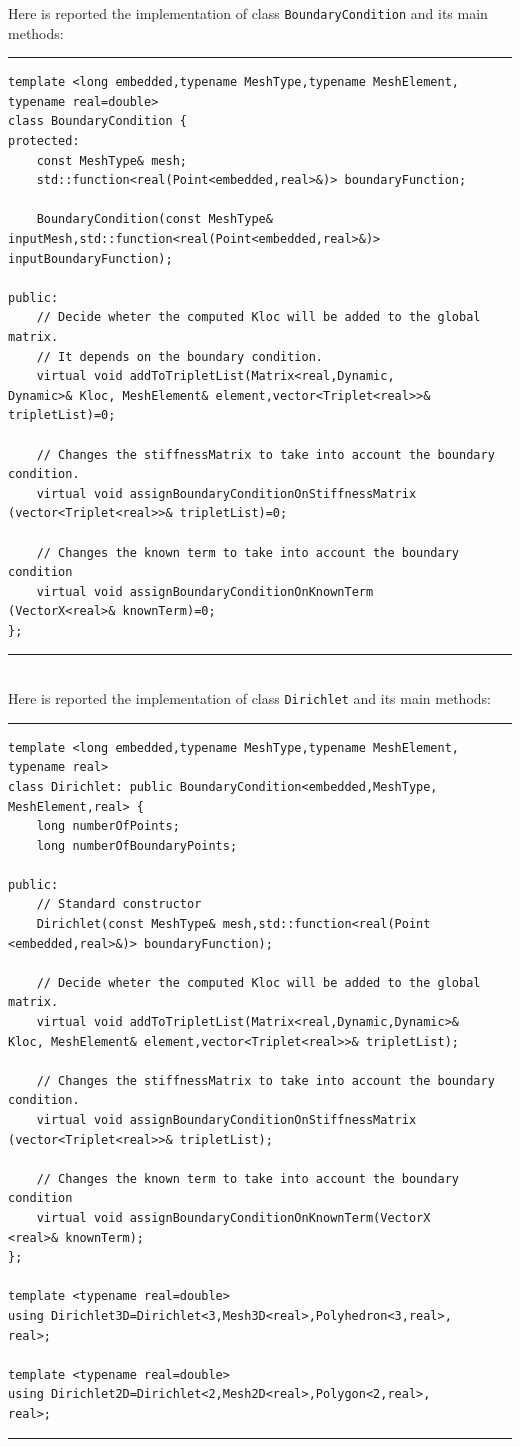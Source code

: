 Here is reported the implementation of class \verb|BoundaryCondition| and its main methods:

\noindent\rule{16cm}{1pt}
\begin{lstlisting}[caption=File \texttt{BoundaryCondition.h}]
template <long embedded,typename MeshType,typename MeshElement,
typename real=double>
class BoundaryCondition {
protected:
    const MeshType& mesh;
    std::function<real(Point<embedded,real>&)> boundaryFunction;

    BoundaryCondition(const MeshType&
inputMesh,std::function<real(Point<embedded,real>&)> 
inputBoundaryFunction);

public:
    // Decide wheter the computed Kloc will be added to the global matrix.
    // It depends on the boundary condition.	
    virtual void addToTripletList(Matrix<real,Dynamic,
Dynamic>& Kloc, MeshElement& element,vector<Triplet<real>>& 
tripletList)=0;
	
    // Changes the stiffnessMatrix to take into account the boundary condition.
    virtual void assignBoundaryConditionOnStiffnessMatrix
(vector<Triplet<real>>& tripletList)=0;
	
    // Changes the known term to take into account the boundary condition
    virtual void assignBoundaryConditionOnKnownTerm
(VectorX<real>& knownTerm)=0; 		
};

\end{lstlisting}

\noindent\rule{16cm}{1pt}\\

Here is reported the implementation of class \verb|Dirichlet| and its main methods:

\noindent\rule{16cm}{1pt}
\begin{lstlisting}[caption=File \texttt{Dirichlet.h}]
template <long embedded,typename MeshType,typename MeshElement,
typename real>
class Dirichlet: public BoundaryCondition<embedded,MeshType,
MeshElement,real> {
    long numberOfPoints;
    long numberOfBoundaryPoints;

public:
    // Standard constructor
    Dirichlet(const MeshType& mesh,std::function<real(Point
<embedded,real>&)> boundaryFunction);
	
    // Decide wheter the computed Kloc will be added to the global matrix.
    virtual void addToTripletList(Matrix<real,Dynamic,Dynamic>& 
Kloc, MeshElement& element,vector<Triplet<real>>& tripletList);
	
    // Changes the stiffnessMatrix to take into account the boundary condition.
    virtual void assignBoundaryConditionOnStiffnessMatrix
(vector<Triplet<real>>& tripletList);
	
    // Changes the known term to take into account the boundary condition
    virtual void assignBoundaryConditionOnKnownTerm(VectorX
<real>& knownTerm);	
};

template <typename real=double>
using Dirichlet3D=Dirichlet<3,Mesh3D<real>,Polyhedron<3,real>,
real>;

template <typename real=double>
using Dirichlet2D=Dirichlet<2,Mesh2D<real>,Polygon<2,real>,
real>;
\end{lstlisting}
\noindent\rule{16cm}{1pt}

